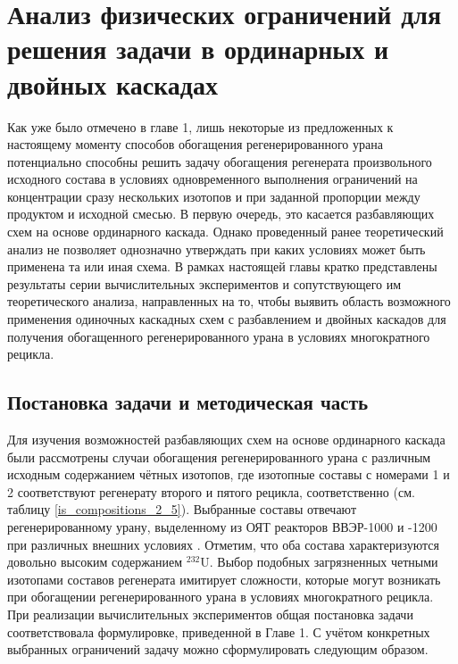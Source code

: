 \chapter{Анализ физических ограничений для решения задачи в ординарных и двойных каскадах}\label{ch:ch2}

Как уже было отмечено в главе 1, лишь некоторые из предложенных к настоящему моменту способов обогащения регенерированного урана потенциально способны решить задачу обогащения регенерата произвольного исходного состава в условиях одновременного выполнения ограничений на концентрации сразу нескольких изотопов и при заданной пропорции между продуктом и исходной смесью. В первую очередь, это касается разбавляющих схем на основе ординарного каскада. 
Однако проведенный ранее теоретический анализ не позволяет однозначно утверждать при каких условиях может быть применена та или иная схема. В рамках настоящей главы кратко представлены результаты серии вычислительных экспериментов и сопутствующего им теоретического анализа, направленных на то, чтобы выявить область возможного применения одиночных каскадных схем с разбавлением и двойных каскадов для получения обогащенного регенерированного урана в условиях многократного рецикла. 

\section{Постановка задачи и методическая часть}

Для изучения возможностей разбавляющих схем на основе ординарного каскада были рассмотрены случаи обогащения регенерированного урана с различным исходным содержанием чётных изотопов, где изотопные составы с номерами 1 и 2 соответствуют регенерату второго и пятого рецикла, соответственно (см. таблицу \ref{is_compositions_2_5}). Выбранные составы отвечают регенерированному урану, выделенному из ОЯТ реакторов ВВЭР-1000 и -1200 при различных внешних условиях \cite{palkinDesignanalyticalResearchRefinement2010,nevinicaToplivnyyCiklLegkovodnogo2019}. Отметим, что оба состава характеризуются довольно высоким содержанием $^{232}$U. Выбор подобных загрязненных четными изотопами составов регенерата имитирует сложности, которые могут возникать при обогащении регенерированного урана в условиях многократного рецикла.  
При реализации вычислительных экспериментов общая постановка задачи соответствовала формулировке, приведенной в Главе 1. С учётом конкретных выбранных ограничений задачу можно сформулировать следующим образом.

